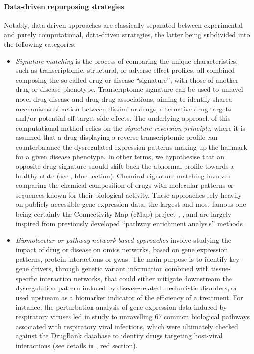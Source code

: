 \paragraph{Data-driven repurposing strategies}

Notably, data-driven approaches are classically separated between experimental and purely computational, data-driven strategies, the latter being subdivided into the following categories: 

\begin{itemize}
\item \emph{Signature matching} is the process of comparing the unique characteristics, such as transcriptomic, structural, or adverse effect profiles, all combined composing the so-called drug or disease \enquote{signature}, with those of another drug or disease phenotype. Transcriptomic signature can be used to unravel novel drug-disease and drug-drug associations, aiming to identify shared mechanisms of action between dissimilar drugs, alternative drug targets and/or potential off-target side effects. The underlying approach of this computational method relies on the \emph{signature reversion principle}, where it is assumed that a drug displaying a reverse transcriptomic profile can counterbalance the dysregulated expression patterns making up the hallmark for a given disease phenotype. In other terms, we hypothesise that an opposite drug signature should shift back the abnormal profile towards a healthy state (see , blue section). Chemical signature matching involves comparing the chemical composition of drugs with molecular patterns or sequences known for their biological activity. These approaches rely heavily on publicly accessible gene expression data, the largest and most famous one being certainly the Connectivity Map (cMap) project \autocite{lamb_etal06}, \autocite{lamb07}, and are largely inspired from previously developed \enquote{pathway
enrichment analysis} methods \autocite{zhao_rhee23} \autocite{subramanian_etal05} \autocite{lamb_etal03}. 

\item \emph{Biomolecular or pathway network-based approaches} involve studying the impact of drug or disease on omics networks, based on gene expression patterns, protein interactions or \acrfull{gwas}. The main purpose is to identify key gene drivers, through genetic variant information combined with tissue-specific interaction networks, that could either mitigate downstream the dysregulation pattern induced by disease-related mechanistic disorders, or used upstream as a biomarker indicator of the efficiency of a treatment. For instance, the perturbation analysis of gene expression data induced by respiratory viruses led in study \autocite{smith_etal12} to unravelling 67 common biological pathways associated with respiratory viral infections, which were ultimately checked against the DrugBank database to identify drugs targeting host-viral interactions (see details in , red section).


\end{itemize}

